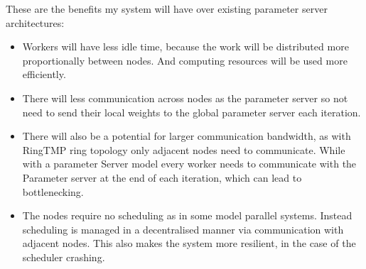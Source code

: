 These are the benefits my system will have over existing parameter server
architectures:
\begin{itemize}

    \item Workers will have less idle time, because the work will be distributed
    more proportionally between nodes. And computing resources will be used more
    efficiently.
    \item There will less communication across nodes as the parameter server so
    not need to send their local weights to the global parameter server each
    iteration.
    \item There will also be a potential for larger communication bandwidth, as
    with RingTMP ring topology only adjacent nodes need to communicate. While
    with a parameter Server model every worker needs to communicate with the
    Parameter server at the end of each iteration, which can lead to
    bottlenecking.
    \item The nodes require no scheduling as in some model parallel systems.
    Instead scheduling is managed in a decentralised manner via communication
    with adjacent nodes. This also makes the system more resilient, in the case
    of the scheduler crashing.
\end{itemize}

